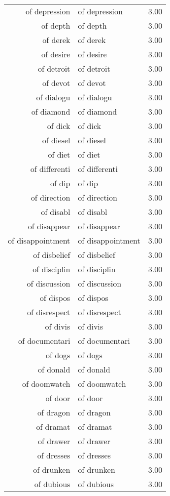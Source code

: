 \begin{table}[ht]
\begin{tabular}{rlr}
  of depression & of depression & 3.00 \\ 
  of depth & of depth & 3.00 \\ 
  of derek & of derek & 3.00 \\ 
  of desire & of desire & 3.00 \\ 
  of detroit & of detroit & 3.00 \\ 
  of devot & of devot & 3.00 \\ 
  of dialogu & of dialogu & 3.00 \\ 
  of diamond & of diamond & 3.00 \\ 
  of dick & of dick & 3.00 \\ 
  of diesel & of diesel & 3.00 \\ 
  of diet & of diet & 3.00 \\ 
  of differenti & of differenti & 3.00 \\ 
  of dip & of dip & 3.00 \\ 
  of direction & of direction & 3.00 \\ 
  of disabl & of disabl & 3.00 \\ 
  of disappear & of disappear & 3.00 \\ 
  of disappointment & of disappointment & 3.00 \\ 
  of disbelief & of disbelief & 3.00 \\ 
  of disciplin & of disciplin & 3.00 \\ 
  of discussion & of discussion & 3.00 \\ 
  of dispos & of dispos & 3.00 \\ 
  of disrespect & of disrespect & 3.00 \\ 
  of divis & of divis & 3.00 \\ 
  of documentari & of documentari & 3.00 \\ 
  of dogs & of dogs & 3.00 \\ 
  of donald & of donald & 3.00 \\ 
  of doomwatch & of doomwatch & 3.00 \\ 
  of door & of door & 3.00 \\ 
  of dragon & of dragon & 3.00 \\ 
  of dramat & of dramat & 3.00 \\ 
  of drawer & of drawer & 3.00 \\ 
  of dresses & of dresses & 3.00 \\ 
  of drunken & of drunken & 3.00 \\ 
  of dubious & of dubious & 3.00 \\ 

\end{tabular}
\end{table}
